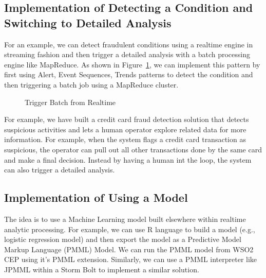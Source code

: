 \documentclass{sig-alternate}
\begin{document}
{%




\vspace{10 mm}

\subsection{Implementation of Detecting a Condition and Switching to Detailed Analysis}
For an example, we can detect fraudulent conditions using a realtime engine in streaming fashion and then trigger a detailed analysis with a batch processing engine like MapReduce. As shown in Figure~\ref{fig:q4}, we can implement this pattern by first using Alert, Event Sequences, Trends patterns to detect the condition and then triggering a batch job using a MapReduce cluster. 

\begin{figure}[!htbp]
\centering
{}
\caption{Trigger Batch from Realtime}
\label{fig:q4}
\end{figure}

For example, we have built a credit card fraud detection solution that detects suspicious activities and lets a human operator explore related data for more information. For example, when the system flags a credit card transaction as suspicious, the operator can pull out all other transactions done by the same card and make a final decision. Instead by having a human int the loop, the system can also trigger a detailed analysis. 



\subsection{Implementation of Using a Model}

The idea is to use a Machine Learning model built elsewhere within realtime analytic processing. For example, we can use R language to build a model (e.g., logistic regression model) and then export the model as a Predictive Model Markup Language (PMML) Model. We can run the PMML model from WSO2 CEP using it's PMML extension. Similarly, we can use a PMML interpreter like JPMML within a Storm Bolt to implement a similar solution. 

}
\end{document}
